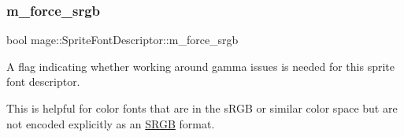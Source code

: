 \subsubsection{\texorpdfstring{m\+\_\+force\+\_\+srgb}{m\_force\_srgb}}
{\footnotesize\ttfamily bool mage\+::\+Sprite\+Font\+Descriptor\+::m\+\_\+force\+\_\+srgb\hspace{0.3cm}{\ttfamily [private]}}

A flag indicating whether working around gamma issues is needed for this sprite font descriptor.

This is helpful for color fonts that are in the s\+R\+GB or similar color space but are not encoded explicitly as an \hyperlink{structmage_1_1_s_r_g_b}{S\+R\+GB} format. 
